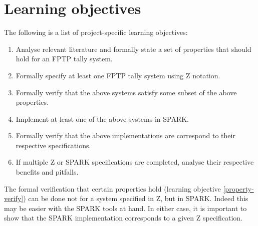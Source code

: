 
\section*{Learning objectives}

The following is a list of project-specific learning objectives:

\begin{enumerate}

\item Analyse relevant literature and formally state a set of properties that
should hold for an FPTP tally system.

\item Formally specify at least one FPTP tally system using Z notation.

\item Formally verify that the above systems satisfy some subset of the above
properties. \label{property-verify}

\item Implement at least one of the above systems in SPARK.

\item Formally verify that the above implementations are correspond to their
respective specifications.

\item If multiple Z or SPARK specifications are completed, analyse their
respective benefits and pitfalls.

\end{enumerate}

The formal verification that certain properties hold (learning objective
\ref{property-verify}) can be done not for a system specified in Z, but in
SPARK. Indeed this may be easier with the SPARK tools at hand. In either case,
it is important to show that the SPARK implementation corresponds to a given Z
specification.

